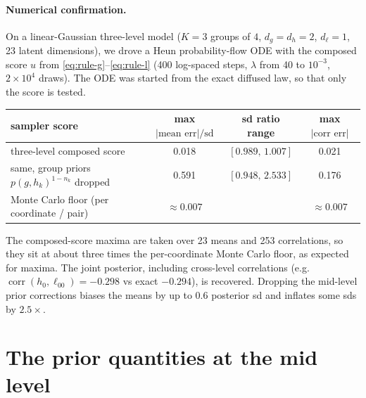 \documentclass[11pt]{article}
\theoremstyle{definition}
\theoremstyle{remark}
\newcommand{\lam}{\lambda}
\newcommand{\hk}{h_k}
\begin{document}
\paragraph{Numerical confirmation.} On a linear-Gaussian three-level model
($K=3$ groups of $4$, $d_g=d_h=2$, $d_\ell=1$, 23 latent dimensions), we drove a
Heun probability-flow ODE with the composed score $u$ from \eqref{eq:rule-g}--\eqref{eq:rule-l}
(400 log-spaced steps, $\lam$ from 40 to $10^{-3}$, $2\times10^4$ draws). The
ODE was started from the exact diffused law, so that only the score is tested.
\begin{center}\small
\begin{tabular}{@{}lccc@{}}
\toprule
sampler score & max $|\text{mean err}|/\text{sd}$ & sd ratio range & max $|\text{corr err}|$\\
\midrule
three-level composed score & 0.018 & $[0.989,\,1.007]$ & 0.021\\
same, group priors $p(g,\hk)^{1-n_k}$ dropped & 0.591 & $[0.948,\,2.533]$ & 0.176\\
\midrule
Monte Carlo floor (per coordinate / pair) & $\approx0.007$ & & $\approx0.007$\\
\bottomrule
\end{tabular}
\end{center}
The composed-score maxima are taken over 23 means and 253 correlations, so they
sit at about three times the per-coordinate Monte Carlo floor, as expected for
maxima. The joint posterior, including cross-level correlations (e.g.\
$\operatorname{corr}(h_{0},\ell_{00})=-0.298$ vs exact $-0.294$), is recovered.
Dropping the mid-level prior corrections biases the means by up to $0.6$
posterior sd and inflates some sds by $2.5\times$.

\section{The prior quantities at the mid level}\label{sec:prior}
\end{document}
